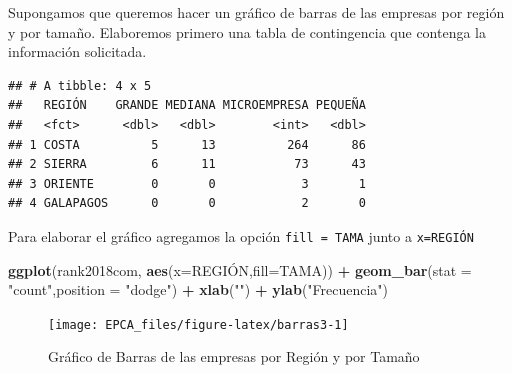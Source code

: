 \documentclass[
]{krantz}
\makeatletter
\newenvironment{Shaded}{\begin{snugshade}}{\end{snugshade}}
\newcommand{\DataTypeTok}[1]{\textcolor[rgb]{0.27,0.27,0.27}{#1}}
\newcommand{\DecValTok}[1]{\textcolor[rgb]{0.06,0.06,0.06}{#1}}
\newcommand{\KeywordTok}[1]{\textcolor[rgb]{0.27,0.27,0.27}{\textbf{#1}}}
\newcommand{\NormalTok}[1]{#1}
\newcommand{\OperatorTok}[1]{\textcolor[rgb]{0.43,0.43,0.43}{\textbf{#1}}}
\newcommand{\StringTok}[1]{\textcolor[rgb]{0.5,0.5,0.5}{#1}}
\newenvironment{kframe}{%
\medskip{}
\setlength{\fboxsep}{.8em}
 \def\at@end@of@kframe{}%
 \ifinner\ifhmode%
  \def\at@end@of@kframe{\end{minipage}}%
  \begin{minipage}{\columnwidth}%
 \fi\fi%
 \def\FrameCommand##1{\hskip\@totalleftmargin \hskip-\fboxsep
 \colorbox{shadecolor}{##1}\hskip-\fboxsep
     \hskip-\linewidth \hskip-\@totalleftmargin \hskip\columnwidth}%
 \MakeFramed {\advance\hsize-\width
   \@totalleftmargin\z@ \linewidth\hsize
   \@setminipage}}%
 {\par\unskip\endMakeFramed%
 \at@end@of@kframe}
\renewenvironment{Shaded}{\begin{kframe}}{\end{kframe}}
\makeatother
\begin{document}
Supongamos que queremos hacer un gráfico de barras de las empresas por región y por tamaño. Elaboremos primero una tabla de contingencia que contenga la información solicitada.

\begin{Shaded}
\end{Shaded}

\begin{verbatim}
## # A tibble: 4 x 5
##   REGIÓN    GRANDE MEDIANA MICROEMPRESA PEQUEÑA
##   <fct>      <dbl>   <dbl>        <int>   <dbl>
## 1 COSTA          5      13          264      86
## 2 SIERRA         6      11           73      43
## 3 ORIENTE        0       0            3       1
## 4 GALAPAGOS      0       0            2       0
\end{verbatim}

Para elaborar el gráfico agregamos la opción \texttt{fill\ =\ TAMA} junto a \texttt{x=REGIÓN}

\begin{Shaded}
\begin{Highlighting}[]
\KeywordTok{ggplot}\NormalTok{(rank2018com, }\KeywordTok{aes}\NormalTok{(}\DataTypeTok{x=}\NormalTok{REGIÓN,}\DataTypeTok{fill=}\NormalTok{TAMA)) }\OperatorTok{+}\StringTok{ }
\StringTok{  }\KeywordTok{geom_bar}\NormalTok{(}\DataTypeTok{stat =} \StringTok{"count"}\NormalTok{,}\DataTypeTok{position =} \StringTok{"dodge"}\NormalTok{) }\OperatorTok{+}
\StringTok{  }\KeywordTok{xlab}\NormalTok{(}\StringTok{""}\NormalTok{) }\OperatorTok{+}\StringTok{ }\KeywordTok{ylab}\NormalTok{(}\StringTok{"Frecuencia"}\NormalTok{)}
\end{Highlighting}
\end{Shaded}

\begin{figure}[h!]

{\centering \texttt{[image: EPCA\_files/figure-latex/barras3-1]} 

}

\caption{Gráfico de Barras de las empresas por Región y por Tamaño}\label{fig:barras3}
\end{figure}
\end{document}
